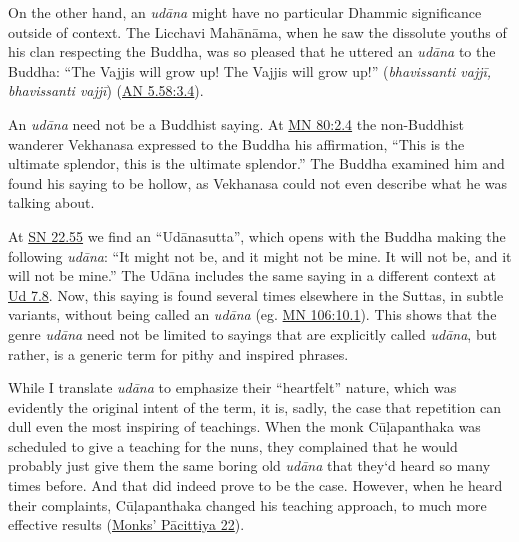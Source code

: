 \documentclass[12pt,openany]{book}%
\begin{document}
On the other hand, an \textit{\textsanskrit{udāna}} might have no particular Dhammic significance outside of context. The Licchavi \textsanskrit{Mahānāma}, when he saw the dissolute youths of his clan respecting the Buddha, was so pleased that he uttered an \textit{\textsanskrit{udāna}} to the Buddha: “The Vajjis will grow up! The Vajjis will grow up!” (\textit{bhavissanti \textsanskrit{vajjī}, bhavissanti \textsanskrit{vajjī}}) (\href{https://suttacentral.net/an5.58/en/sujato\#3.4}{AN 5.58:3.4}).

An \textit{\textsanskrit{udāna}} need not be a Buddhist saying. At \href{https://suttacentral.net/mn80/en/sujato\#2.4}{MN 80:2.4} the non-Buddhist wanderer Vekhanasa expressed to the Buddha his affirmation, “This is the ultimate splendor, this is the ultimate splendor.” The Buddha examined him and found his saying to be hollow, as Vekhanasa could not even describe what he was talking about.

At \href{https://suttacentral.net/sn22.55/en/sujato}{SN 22.55}  we find an “\textsanskrit{Udānasutta}”, which opens with the Buddha making the following \textit{\textsanskrit{udāna}}: “It might not be, and it might not be mine. It will not be, and it will not be mine.” The \textsanskrit{Udāna} includes the same saying in a different context at \href{https://suttacentral.net/ud7.8/en/sujato}{Ud 7.8}. Now, this saying is found several times elsewhere in the Suttas, in subtle variants, without being called an \textit{\textsanskrit{udāna}} (eg. \href{https://suttacentral.net/mn106/en/sujato\#10.1}{MN 106:10.1}). This shows that the genre \textit{\textsanskrit{udāna}} need not be limited to sayings that are explicitly called \textit{\textsanskrit{udāna}}, but rather, is a generic term for pithy and inspired phrases. 

While I translate \textit{\textsanskrit{udāna}} to emphasize their “heartfelt” nature, which was evidently the original intent of the term, it is, sadly, the case that repetition can dull even the most inspiring of teachings. When the monk \textsanskrit{Cūḷapanthaka} was scheduled to give a teaching for the nuns, they complained that he would probably just give them the same boring old \textit{\textsanskrit{udāna}} that they‘d heard so many times before. And that did indeed prove to be the case. However, when he heard their complaints, \textsanskrit{Cūḷapanthaka} changed his teaching approach, to much more effective results (\href{https://suttacentral.net/pli{-}tv{-}bu{-}vb{-}pc22/en/brahmali}{Monks’ Pācittiya 22}). 
\end{document}
